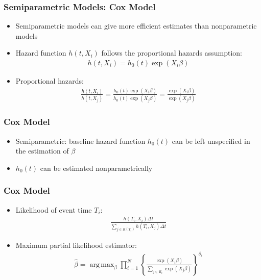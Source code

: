 \documentclass[14pt]{beamer}
\DeclareMathOperator*{\argmax}{arg\,max}
\begin{document}
	\begin{frame}
	\frametitle{Semiparametric Models: Cox Model}
	\begin{itemize}
	\item Semiparametric models can give more efficient estimates than nonparametric models
	\item Hazard function $h(t,X_i)$ follows the proportional hazards assumption:
	\begin{eqnarray*}
	h(t,X_i) = h_0(t) \exp(X_i \beta)
	\end{eqnarray*}
	\item Proportional hazards:
	\begin{eqnarray*}
	\frac{h(t,X_i)}{h(t,X_j)} = \frac{h_0(t) \exp(X_i \beta)}{h_0(t) \exp(X_j \beta)} = \frac{\exp(X_i \beta)}{\exp(X_j \beta)}
	\end{eqnarray*}

	\end{itemize}

	\end{frame}

	\begin{frame}
	\frametitle{Cox Model}
	\begin{itemize}
	\item Semiparametric: baseline hazard function $h_0(t)$ can be left unspecified in the estimation of $\beta$
	\item $h_0(t)$ can be estimated nonparametrically

	\end{itemize}

	\end{frame}

	\begin{frame}
	\frametitle{Cox Model}
	\begin{itemize}
	\item Likelihood of event time $T_i$:
	\begin{eqnarray*}
	\frac{h(T_i,X_i) \Delta t}{\sum_{j \in R(T_i)} h(T_i,X_j) \Delta t}
	\end{eqnarray*}
	\item Maximum partial likelihood estimator:
	\begin{eqnarray*}
	\hat{\beta} = \argmax_{\beta} \prod_{i=1}^N \left\{\frac{\exp(X_i \beta)}{\sum_{j \in R_i} \exp(X_j \beta)} \right\}^{\delta_i}
	\end{eqnarray*}

	\end{itemize}

	\end{frame}
\end{document}
